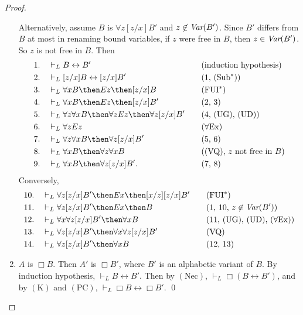 \documentclass[11pt]{woarticle}
\theoremstyle{break}
\theoremstyle{nonumberplain}
\newcommand{\1}{\;\,|\;\,}
\newcommand{\var}{\emph{Var}}
\newcommand{\T}[1]{\ensuremath{(\mathrm{ #1})}}
\begin{document}
\begin{proof}
\begin{enumerate}
    Alternatively, assume $B$ is $\forall z [z/x]B'$ and $z\not\in
    \var(B')$. Since $B'$ differs from $B$ at most in renaming bound
    variables, if $z$ were free in $B$, then $z \in \var(B')$. So $z$
    is not free in $B$. Then
    \begin{alignat*}{2}
      1.\quad&\vdash_{L} B \leftrightarrow B' &\quad&\text{(induction hypothesis)}\\
      2.\quad&\vdash_{L} [z/x]B \leftrightarrow [z/x]B' 
        &&\text{(1, \T{Sub^*})}\\
      3.\quad&\vdash_{L} \forall x B \then Ez \then [z/x]B &&\text{\T{FUI^*}}\\
      4.\quad&\vdash_{L} \forall x B \then Ez \then [z/x]B'&&\text{(2, 3)}\\
      5.\quad&\vdash_{L} \forall z \forall x B \then \forall z Ez \then \forall z [z/x]B'
        &&\text{(4, \T{UG}, \T{UD})}\\
      6.\quad&\vdash_{L} \forall z Ez &&\text{\T{\forall Ex}}\\
      7.\quad&\vdash_{L} \forall z \forall x B \then \forall z [z/x]B' &&\text{(5, 6)}\\
      8.\quad&\vdash_{L} \forall x B \then \forall z \forall x B 
        &&\text{(\T{VQ}, $z$ not free in $B$)}\\
      9.\quad&\vdash_{L} \forall x B \then \forall z [z/x]B'. &&\text{(7, 8)}
    \end{alignat*}
    Conversely,
    \begin{alignat*}{2}
      10.\quad&\vdash_{L} \forall z [z/x]B' \then Ex \then [x/z][z/x]B' 
         &\quad&\text{\T{FUI^*}}\\
      11.\quad&\vdash_{L} \forall z [z/x]B' \then Ex \then B 
         &&\text{(1, 10, $z\not\in \var(B')$)}\\
      12.\quad&\vdash_L \forall x \forall z [z/x]B' \then \forall x B 
         &&\text{(11, \T{UG}, \T{UD}, \T{\forall Ex})}\\
      13.\quad&\vdash_L \forall z [z/x]B' \then \forall x \forall z [z/x]B' 
         &&\text{\T{VQ}}\\
      14.\quad&\vdash_{L} \forall z [z/x]B' \then \forall x B &&\text{(12, 13)}
    \end{alignat*}

  \item $A$ is $\Box B$.\; Then $A'$ is $\Box B'$, where $B'$ is an
    alphabetic variant of $B$. By induction hypothesis, $\vdash_{L} B
    \leftrightarrow B'$. Then by \T{Nec}, $\vdash_{L} \Box(B
    \leftrightarrow B')$, and by \T{K} and \T{PC}, $\vdash_{L} \Box B
    \leftrightarrow \Box B'$. \qed
  \end{enumerate}
\end{proof}
\end{document}
